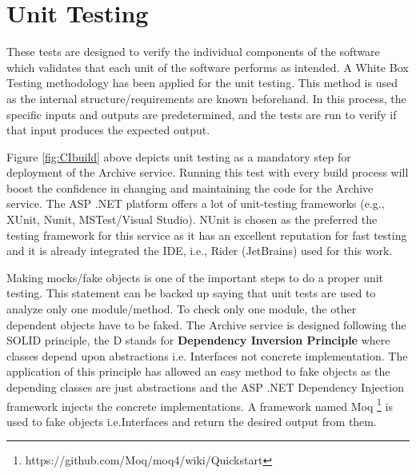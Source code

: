 \section{Unit Testing}
These tests are designed to verify the individual components of the software which validates that each unit of the software performs as intended. A White Box
Testing methodology has been applied for the unit testing. This method is used as the internal structure/requirements are known beforehand. In this process,
the specific inputs and outputs are predetermined, and the tests are run to verify if that input produces the expected output.

\par
Figure \ref{fig:CIbuild} above depicts
unit testing as a mandatory step for deployment of the Archive service. Running this test with every build process will boost the confidence 
in changing and maintaining the code for the Archive service. The ASP .NET platform offers a lot of unit-testing frameworks 
(e.g., XUnit, Nunit, MSTest/Visual Studio). NUnit is chosen as the preferred the testing framework for this service as it has an excellent reputation for
fast testing and it is already integrated the IDE, i.e., Rider (JetBrains) used for this work. 

\par
Making mocks/fake objects is one of the important steps to do a proper unit testing. This statement can be backed up saying that unit tests are
used to analyze only one module/method. To check only one module, the other dependent objects have to be faked. The Archive service is designed following the
SOLID \cite{Hotop2015} principle, the D stands for \textbf{Dependency Inversion Principle} where classes depend upon abstractions i.e. Interfaces not concrete
implementation. The application of this principle has allowed an easy method to fake objects as the depending classes are just abstractions and 
the ASP .NET Dependency Injection framework injects the concrete implementations. A framework named Moq \footnote{https://github.com/Moq/moq4/wiki/Quickstart} is used
to fake objects i.e.Interfaces and return the desired output from them. 

